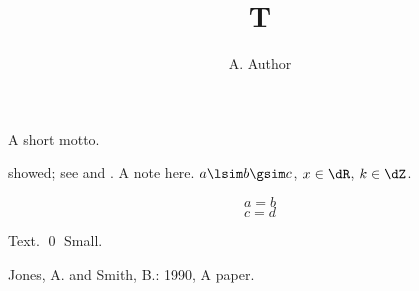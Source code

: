 \documentclass{kluwer}
\begin{document}
\begin{article}
\begin{opening}
\title{T}
\author{A. Author}
\begin{motto}
A short motto.
\end{motto}
\end{opening}
 showed; see  and .
A note here.
$a\lsim b\gsim c$, $x\in\dR$, $k\in\dZ$.
\begin{subequation}
\begin{equation}
a=b
\end{equation}
\begin{equation}
c=d
\end{equation}
\end{subequation}
Text. \qed
{\tabcapfont Small.}
\theendnotes
\begin{thebibliography}{}
 Jones, A. and Smith, B.: 1990, A paper.
\end{thebibliography}
\end{article}
\end{document}
